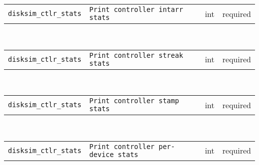 \noindent 
\begin{tabular}{|p{1.5in}|p{3.5in}|p{0.5in}|p{0.5in}|}
\cline{1-4}
\texttt{disksim\_ctlr\_stats} & \texttt{Print controller intarr stats} & int & required \\ 
\cline{1-4}
\end{tabular}\\ 
\noindent 
\begin{tabular}{|p{1.5in}|p{3.5in}|p{0.5in}|p{0.5in}|}
\cline{1-4}
\texttt{disksim\_ctlr\_stats} & \texttt{Print controller streak stats} & int & required \\ 
\cline{1-4}
\end{tabular}\\ 
\noindent 
\begin{tabular}{|p{1.5in}|p{3.5in}|p{0.5in}|p{0.5in}|}
\cline{1-4}
\texttt{disksim\_ctlr\_stats} & \texttt{Print controller stamp stats} & int & required \\ 
\cline{1-4}
\end{tabular}\\ 
\noindent 
\begin{tabular}{|p{1.5in}|p{3.5in}|p{0.5in}|p{0.5in}|}
\cline{1-4}
\texttt{disksim\_ctlr\_stats} & \texttt{Print controller per-device stats} & int & required \\ 
\cline{1-4}
\end{tabular}\\ 
